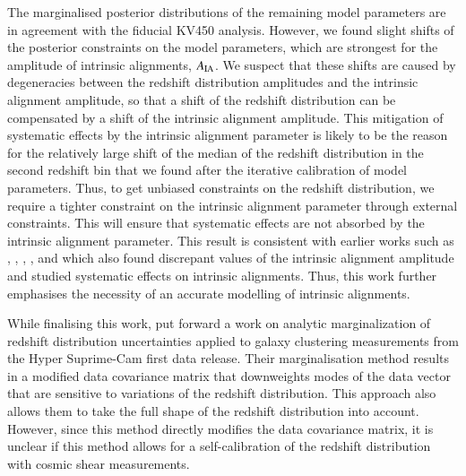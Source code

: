 \documentclass{aa}
\begin{document}
The marginalised posterior distributions of the remaining model parameters are in agreement with the fiducial KV450 analysis. However, we found slight shifts of the posterior constraints on the model parameters, which are strongest for the amplitude of intrinsic alignments, $A_{\rm IA}$. We suspect that these shifts are caused by degeneracies between the redshift distribution amplitudes and the intrinsic alignment amplitude, so that a shift of the redshift distribution can be compensated by a shift of the intrinsic alignment amplitude. This mitigation of systematic effects by the intrinsic alignment parameter is likely to be the reason for the relatively large shift of the median of the redshift distribution in the second redshift bin that we found after the iterative calibration of model parameters. Thus, to get unbiased constraints on the redshift distribution, we require a tighter constraint on the intrinsic alignment parameter through external constraints. This will ensure that systematic effects are not absorbed by the intrinsic alignment parameter. This result is consistent with earlier works such as \cite{wright_som_kv450}, \cite{hildebrandt18}, \cite{fortuna20}, \cite{vanUitert18}, and \cite{Efstathiou18} which also found discrepant values of the intrinsic alignment amplitude and studied systematic effects on intrinsic alignments. Thus, this work further emphasises the necessity of an accurate modelling of intrinsic alignments.

While finalising this work, \cite{Hadzhiyska20} put forward a work on analytic marginalization of redshift distribution uncertainties applied to galaxy clustering measurements from the Hyper Suprime-Cam first data release. Their marginalisation method results in a modified data covariance matrix that downweights modes of the data vector that are sensitive to variations of the redshift distribution. This approach also allows them to take the full shape of the redshift distribution into account. However, since this method directly modifies the data covariance matrix, it is unclear if this method allows for a self-calibration of the redshift distribution with cosmic shear measurements. 
\end{document}
